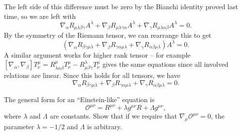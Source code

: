 \documentclass{../../templates/lkx_pset}
\begin{document}
\begin{solution}
  The left side of this difference must be zero by the Bianchi identity proved last time, so we are left with
  \[
    \nabla_\alpha R_{\mu\lambda\beta\gamma}A^\lambda 
    +\nabla_\beta R_{\mu\lambda\gamma\alpha}A^\lambda 
    +\nabla_\gamma R_{\mu\lambda\alpha\beta}A^\lambda = 0.
  \]
  By the symmetry of the Riemann tensor, we can rearrange this to get
  \[
    (\nabla_\alpha R_{\beta\gamma\mu\lambda}
    +\nabla_\beta R_{\gamma\alpha\mu\lambda}
    +\nabla_\gamma R_{\alpha\beta\mu\lambda})A^\lambda = 0.
  \]
  A similar argument works for higher rank tensor -- for example $[\nabla_\alpha, \nabla_\beta] T^{\mu}_\nu = R^\mu_{\lambda\alpha\beta} T^{\mu}_\nu - R^\lambda_{\mu\beta\gamma} T^{\mu}_{\nu}$ gives the same equations since all involved relations are linear. Since this holds for all tensors, we have
  \[
    \nabla_\alpha R_{\beta\gamma\mu\lambda}
    +\nabla_\beta R_{\gamma\alpha\mu\lambda}
    +\nabla_\gamma R_{\alpha\beta\mu\lambda} = 0.
  \]
\end{solution}

\begin{problem}{5}
  The general form for an ``Einstein-like'' equation is
  \[
    \mathcal{O}^{\mu\nu} = R^{\mu\nu} + \lambda g^{\mu\nu} R + \Lambda g^{\mu\nu},
  \]
  where $\lambda$ and $\Lambda$ are constants. Show that if we require that $\nabla_{\mu}\mathcal{O}^{\mu\nu}=0$, the parameter $\lambda=-1/2$ and $\Lambda$ is arbitrary.
\end{problem}
\end{document}
